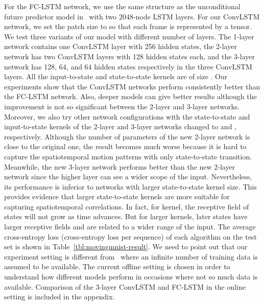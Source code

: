 \documentclass{article} \usepackage{amsmath}
\begin{document}
For the FC-LSTM network, we use the same structure as the unconditional future predictor model in~\cite{srivastava2015unsupervised} with two 2048-node LSTM layers. For our ConvLSTM network, we set the patch size to  so that each  frame is represented by a  tensor. We test three variants of our model with different number of layers.
The 1-layer network contains one ConvLSTM layer with 256 hidden states, the 2-layer network has two ConvLSTM layers with 128 hidden states each, and the 3-layer network has 128, 64, and 64 hidden states respectively in the three ConvLSTM layers. All the input-to-state and state-to-state kernels are of size . Our experiments show that the ConvLSTM networks perform consistently better than the FC-LSTM network.  Also, deeper models can give better results although the improvement is not so significant between the 2-layer and 3-layer networks. Moreover, we also try other network configurations with the state-to-state and input-to-state kernels of the 2-layer and 3-layer networks changed to  and , respectively. Although the number of parameters of the new 2-layer network is close to the original one, the result becomes much worse because it is hard to capture the spatiotemporal motion patterns with only  state-to-state transition. Meanwhile, the new 3-layer network performs better than the new 2-layer network since the higher layer can see a wider scope of the input. Nevertheless, its performance is inferior to networks with larger state-to-state kernel size. This provides evidence that larger state-to-state kernels are more suitable for capturing spatiotemporal correlations. In fact, for  kernel, the receptive field of states will not grow as time advances. But for larger kernels, later states have larger receptive fields and are related to a wider range of the input. The average cross-entropy loss (cross-entropy loss per sequence) of each algorithm on the test set is shown in Table~\ref{tbl:movingmnist-result}.
We need to point out that our experiment setting is different from~\cite{srivastava2015unsupervised} where an infinite number of training data is assumed to be available. The current offline setting is chosen in order to understand how different models perform in occasions where not so much data is available. Comparison of the 3-layer ConvLSTM and FC-LSTM in the online setting is included in the appendix.
\end{document}
